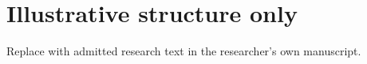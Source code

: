 \documentclass[12pt,a4paper,oneside]{report}
\begin{document}
\PUStartPreliminaries
\tableofcontents
\PUStartMainBody
\chapter{Illustrative structure only}
Replace with admitted research text in the researcher's own manuscript.
\end{document}

